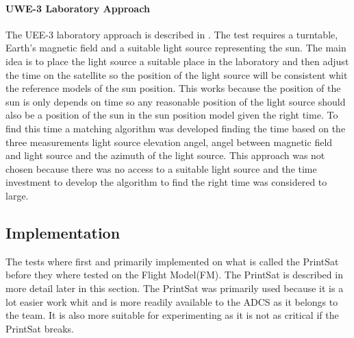 \paragraph{UWE-3 Laboratory Approach}
The UEE-3 laboratory approach is described in \cite{UWE-3}. The test requires a turntable, Earth's magnetic field and a suitable light source representing the sun. The main idea is to place the light source a suitable place in the laboratory and then adjust the time on the satellite so the position of the light source will be consistent whit the reference models of the sun position. This works because the position of the sun is only depends on time so any reasonable position of the light source should also be a position of the sun in the sun position model given the right time. To find this time a matching algorithm was developed finding the time based on the three measurements light source elevation angel, angel between magnetic field and light source and the azimuth of the light source. This approach was not chosen because there was no access to a suitable light source and the time investment to develop the algorithm to find the right time was considered to large.

\subsection{Implementation}
The tests where first and primarily implemented on what is called the PrintSat before they where tested on the Flight Model(FM). The PrintSat is described in more detail later in this section. The PrintSat was primarily used because it is a lot easier work whit and is more readily available to the ADCS as it belongs to the team. It is also more suitable for experimenting as it is not as critical if the PrintSat breaks.     

